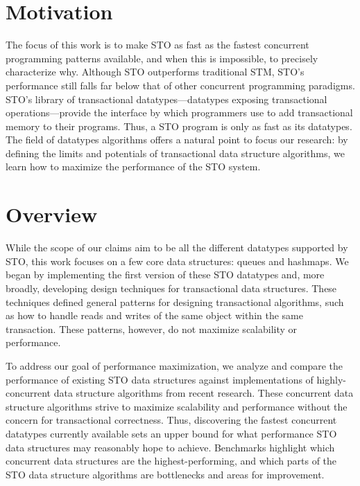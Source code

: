 \section{Motivation}
The focus of this work is to make STO as fast as the fastest concurrent programming patterns available, and when this is impossible, to precisely characterize why. Although STO outperforms traditional STM, STO’s performance still falls far below that of other concurrent programming paradigms. STO’s library of transactional datatypes---datatypes exposing transactional operations---provide the interface by which programmers use to add transactional memory to their programs. Thus, a STO program is only as fast as its datatypes. The field of datatypes algorithms offers a natural point to focus our research: by defining the limits and potentials of transactional data structure algorithms, we learn how to maximize the performance of the STO system.

\section{Overview}
While the scope of our claims aim to be all the different datatypes supported by STO, this work focuses on a few core data structures: queues and hashmaps. We began by implementing the first version of these STO datatypes and, more broadly, developing design techniques for transactional data structures. These techniques defined general patterns for designing transactional algorithms, such as how to handle reads and writes of the same object within the same transaction. These patterns, however, do not maximize scalability or performance.

To address our goal of performance maximization, we analyze and compare the performance of existing STO data structures against implementations of highly-concurrent data structure algorithms from recent research. These concurrent data structure algorithms strive to maximize scalability and performance without the concern for transactional correctness. Thus, discovering the fastest concurrent datatypes currently available sets an upper bound for what performance STO data structures may reasonably hope to achieve. Benchmarks highlight which concurrent data structures are the highest-performing, and which parts of the STO data structure algorithms are bottlenecks and areas for improvement. 

